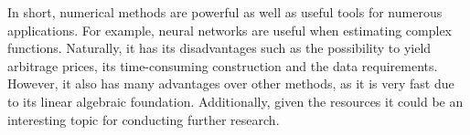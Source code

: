 In short, numerical methods are powerful as well as useful tools for numerous applications. For example, neural networks are useful when estimating complex functions. Naturally, it has its disadvantages such as the possibility to yield arbitrage prices, its time-consuming construction and the data requirements. However, it also has many advantages over other methods, as it is very fast due to its linear algebraic foundation. Additionally, given the resources it could be an interesting topic for conducting further research.

